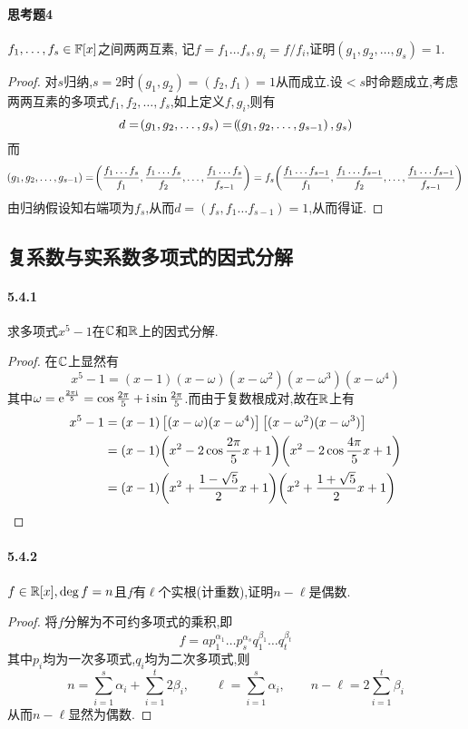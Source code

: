 \documentclass[11pt]{article}
\begin{document}
\paragraph{思考题4}$f_1,\dots,f_s\in \mathbb{F}[x]$之间两两互素, 记$f=f_1\dots f_s, g_i=f/f_i$,证明$(g_1,g_2,\dots,g_s)=1$.
\begin{proof}
    对$s$归纳,$s=2$时$(g_1,g_2)=(f_2,f_1)=1$从而成立.设$<s$时命题成立,考虑两两互素的多项式$f_1,f_2,\dots,f_s$,如上定义$f,g_i$,则有
    $$d=\!\left(g_1,g_2,\dots,g_s\right)=\!\left(\!\left(g_1,g_2,\dots,g_{s-1}\right),g_s\right)$$
    而
    $$\!\left(g_1,g_2,\dots,g_{s-1}\right)=\!\left(\frac{f_1\dots f_s}{f_1},\frac{f_1\dots f_s}{f_2},\dots,\frac{f_1\dots f_s}{f_{s-1}}\right)=f_s\!\left(\frac{f_1\dots f_{s-1}}{f_1},\frac{f_1\dots f_{s-1}}{f_2},\dots,\frac{f_1\dots f_{s-1}}{f_{s-1}}\right)$$
    由归纳假设知右端项为$f_s$,从而$d=(f_s,f_1\dots f_{s-1})=1$,从而得证.
\end{proof}

\subsection{复系数与实系数多项式的因式分解}
\paragraph{5.4.1}求多项式$x^5-1$在$\mathbb{C}$和$\mathbb{R}$上的因式分解.
\begin{proof}
    在$\mathbb{C}$上显然有
    $$x^5-1=(x-1)(x-\omega)(x-\omega^2)(x-\omega^3)(x-\omega^4)$$
    其中$\omega=\mathrm{e}^{\frac{2\pi\mathrm{i}}{5}}=\cos\frac{2\pi}{5}+\mathrm{i} \sin\frac{2\pi}{5}$.而由于复数根成对,故在$\mathbb{R}$上有
    $$\begin{aligned}
        x^5-1&=(x-1)\left[(x-\omega)(x-\omega^4)\right]\left[(x-\omega^2)(x-\omega^3)\right]\\
        &=(x-1)\!\left(x^2-2\cos\frac{2\pi}{5}x+1\right)\!\left(x^2-2\cos\frac{4\pi}{5}x+1\right)\\
        &=(x-1)\!\left(x^2+\frac{1-\sqrt{5}}{2}x+1\right)\!\left(x^2+\frac{1+\sqrt{5}}{2}x+1\right)
    \end{aligned}$$
\end{proof}
\paragraph{5.4.2}$f\in \mathbb{R}[x], \deg f=n$且$f$有$\ell$个实根(计重数),证明$n-\ell$是偶数.
\begin{proof}
    将$f$分解为不可约多项式的乘积,即
    $$f=a p_1^{\alpha_1}\dots p_s^{\alpha_s}q_1^{\beta_1}\dots q_t^{\beta_t}$$
    其中$p_i$均为一次多项式,$q_i$均为二次多项式,则
    $$n=\sum_{i=1}^s \alpha_i + \sum_{i=1}^t 2\beta_i,\qquad \ell=\sum_{i=1}^s \alpha_i,\qquad n-\ell=2\sum_{i=1}^t \beta_i$$
    从而$n-\ell$显然为偶数.
\end{proof}
\end{document}
